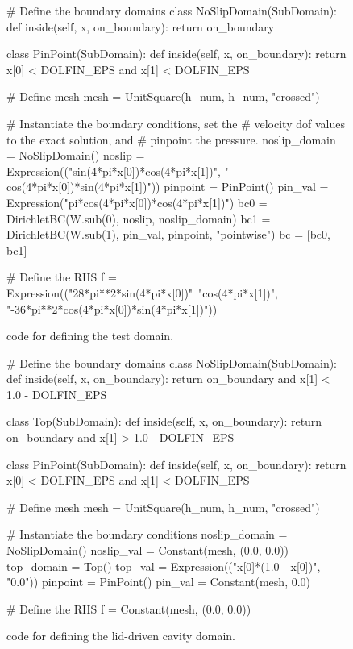 \begin{figure}
\small
\begin{python}
# Define the boundary domains
class NoSlipDomain(SubDomain):
    def inside(self, x, on_boundary):
        return on_boundary

class PinPoint(SubDomain):
    def inside(self, x, on_boundary):
        return x[0] < DOLFIN_EPS and x[1] < DOLFIN_EPS

# Define mesh
mesh = UnitSquare(h_num, h_num, "crossed")

# Instantiate the boundary conditions, set the
# velocity dof values to the exact solution, and
# pinpoint the pressure.
noslip_domain = NoSlipDomain()
noslip = Expression(("sin(4*pi*x[0])*cos(4*pi*x[1])",
               "-cos(4*pi*x[0])*sin(4*pi*x[1])"))
pinpoint = PinPoint()
pin_val = Expression("pi*cos(4*pi*x[0])*cos(4*pi*x[1])")
bc0 = DirichletBC(W.sub(0), noslip, noslip_domain)
bc1 = DirichletBC(W.sub(1), pin_val, pinpoint, "pointwise")
bc = [bc0, bc1]

# Define the RHS
f = Expression(("28*pi**2*sin(4*pi*x[0])"\
         "cos(4*pi*x[1])",
         "-36*pi**2*cos(4*pi*x[0])*sin(4*pi*x[1])"))

\end{python}
\caption{\dolfin{} code for defining the test domain.}
\label{code:terrel:domain:test}
\end{figure}

\begin{figure}
\small
\begin{python}
# Define the boundary domains
class NoSlipDomain(SubDomain):
    def inside(self, x, on_boundary):
        return on_boundary and x[1] < 1.0 - DOLFIN_EPS

class Top(SubDomain):
    def inside(self, x, on_boundary):
        return on_boundary and x[1] > 1.0 - DOLFIN_EPS

class PinPoint(SubDomain):
    def inside(self, x, on_boundary):
        return x[0] < DOLFIN_EPS and x[1] < DOLFIN_EPS

# Define mesh
mesh = UnitSquare(h_num, h_num, "crossed")

# Instantiate the boundary conditions
noslip_domain = NoSlipDomain()
noslip_val = Constant(mesh, (0.0, 0.0))
top_domain = Top()
top_val = Expression(("x[0]*(1.0 - x[0])", "0.0"))
pinpoint = PinPoint()
pin_val = Constant(mesh, 0.0)

# Define the RHS
f = Constant(mesh, (0.0, 0.0))
\end{python}
\caption{\dolfin{} code for defining the lid-driven cavity domain.}
\label{code:terrel:domain:lid}
\end{figure}

